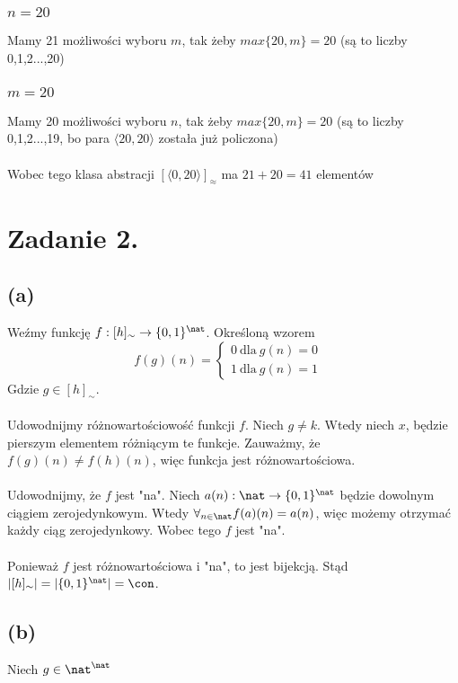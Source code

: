 \documentclass{article}
\begin{document}
\subsubsection*{$n=20$}
Mamy 21 możliwości wyboru $m$, tak żeby $max\{20,m\} = 20$ (są to liczby 0,1,2...,20)

\subsubsection*{$m=20$}
Mamy 20 możliwości wyboru $n$, tak żeby $max\{20,m\} = 20$ (są to liczby 0,1,2...,19, bo para $\langle 20,20 \rangle $ została już policzona)
\\\\
Wobec tego klasa abstracji $[\langle 0,20 \rangle ]_{\approx}$ ma $21+20 = 41$ elementów

\section*{Zadanie 2.}
\subsection*{(a)}
Weźmy funkcję $f: [h]_{\sim} \rightarrow \{0,1\}^\nat$. Określoną wzorem \[f(g)(n) = \left\{\begin{array}{cc} 0
     \ \mbox{dla} \  g(n) = 0  &  \\
     1 \ \mbox{dla} \ g(n) = 1 & 
\end{array}\right.\]
Gdzie $g \in [h]_\sim$.
\\\\
Udowodnijmy różnowartościowość funkcji $f$. Niech $g\neq k$. Wtedy niech $x$, będzie pierszym elementem różniącym te funkcje. Zauważmy, że $f(g)(n) \neq f(h)(n)$, więc funkcja jest różnowartościowa.
\\\\
Udowodnijmy, że $f$ jest "na". Niech $a(n): \nat \rightarrow \{0,1\}^\nat$ będzie dowolnym ciągiem zerojedynkowym. Wtedy $ \forall_{n \in \nat} \\ f(a)(n) = a(n)$, więc możemy otrzymać każdy ciąg zerojedynkowy. Wobec tego $f$ jest "na".
\\\\
Ponieważ $f$ jest różnowartościowa i "na", to jest bijekcją. Stąd $\vert [h]_{\sim} \vert = \vert \{0,1\}^\nat \vert = \con$.
\subsection*{(b)}
Niech $g \in \nat^\nat$
\end{document}
